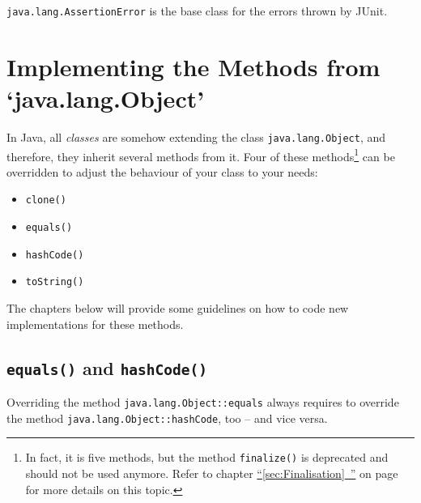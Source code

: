 \documentclass[11pt,a4paper, titlepage, parskip=half, headsepline, footsepline, cleardoublepage=current, headheight=1cm]{scrbook}
\newcommand*{\tqfullvref}[1]{\hyperref[{#1}]{“\ref*{#1}~\nameref*{#1}”} on page~\pageref{#1}}
\begin{document}
\lstinline|java.lang.AssertionError|\autocite{ORACLE_DOC_ASSERTIONERROR_CLASS} is the base class for the errors thrown by JUnit\autocite{JUNIT5}.


\section{Implementing the Methods from ‘java.lang.Object’}\label{sec:ImplementObjectMethods}
In Java, all \textit{classes} are somehow extending the class \lstinline|java.lang.Object|\autocite{ORACLE_DOC_OBJECT_CLASS}, and therefore, they inherit several methods from it. Four of these methods\footnote{In fact, it is five methods, but the method \lstinline|finalize()|\autocite{ORACLE_DOC_OBJECT:finalize} is deprecated and should not be used anymore. Refer to chapter \tqfullvref{sec:Finalisation} for more details on this topic.} can be overridden to adjust the behaviour of your class to your needs:
\begin{itemize}[nosep]
\item{\lstinline|clone()|\autocite{ORACLE_DOC_OBJECT:clone}}

\item{\lstinline|equals()|\autocite{ORACLE_DOC_OBJECT:equals}}

\item{\lstinline|hashCode()|\autocite{ORACLE_DOC_OBJECT:hashCode}}

\item{\lstinline|toString()|\autocite{ORACLE_DOC_OBJECT:toString}}
\end{itemize}

The chapters below will provide some guidelines on how to code new implementations for these methods.


\subsection{\lstinline|equals()| and \lstinline|hashCode()|}\label{sec:EqualsAndHashCode}
Overriding the method \lstinline|java.lang.Object::equals|\autocite{ORACLE_DOC_OBJECT:equals} always requires to override the method \lstinline|java.lang.Object::hashCode|\autocite{ORACLE_DOC_OBJECT:hashCode}, too – and vice versa.
\end{document}
